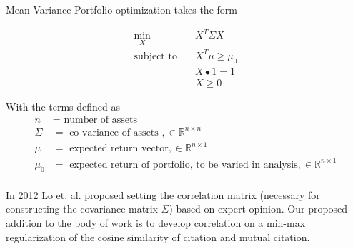 Mean-Variance Portfolio optimization takes the form

\begin{align*}
\min_{X}& \quad X^T \Sigma X \\
\text{subject to}& \quad X^T \mu \geq \mu_0 \\
& \quad X \bullet 1 = 1 \\
& \quad X \geq 0
\end{align*}

With the terms defined as 
\begin{align*}
n &= \text{ number of assets} \\
\Sigma &= \text{ co-variance of assets }, \in \mathbb{R}^{n \times n} \\
\mu &= \text{ expected return vector}, \in \mathbb{R}^{n \times 1} \\
\mu_0 &= \text{ expected return of portfolio, to be varied in analysis}, \in \mathbb{R}^{n \times 1} \\
\end{align*}

In 2012 Lo et. al. proposed setting the correlation matrix (necessary for constructing the covariance matrix $\Sigma$) based on expert opinion. Our proposed addition to the body of work is to develop correlation on a min-max regularization of the cosine similarity of citation and mutual citation.
